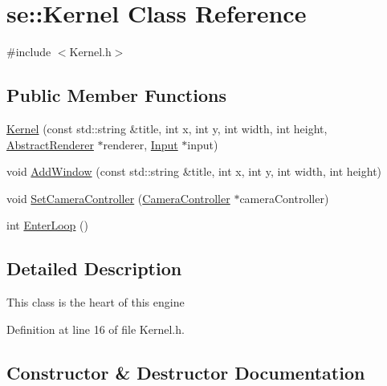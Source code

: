 \hypertarget{classse_1_1_kernel}{}\section{se\+:\+:Kernel Class Reference}
\label{classse_1_1_kernel}


{\ttfamily \#include $<$Kernel.\+h$>$}

\subsection*{Public Member Functions}
\begin{DoxyCompactItemize}
\item 
\mbox{\hyperlink{classse_1_1_kernel_aba58aee3a11c233553f819f4a92694af}{Kernel}} (const std\+::string \&title, int x, int y, int width, int height, \mbox{\hyperlink{classse_1_1_abstract_renderer}{Abstract\+Renderer}} $\ast$renderer, \mbox{\hyperlink{classse_1_1_input}{Input}} $\ast$input)
\item 
void \mbox{\hyperlink{classse_1_1_kernel_aa65f624076feaa97a95901077df35357}{Add\+Window}} (const std\+::string \&title, int x, int y, int width, int height)
\item 
void \mbox{\hyperlink{classse_1_1_kernel_a60a807b4f4e928752e7512f5b7b4a17c}{Set\+Camera\+Controller}} (\mbox{\hyperlink{classse_1_1_camera_controller}{Camera\+Controller}} $\ast$camera\+Controller)
\item 
int \mbox{\hyperlink{classse_1_1_kernel_a1faeac6fce02ccd7ff76d94ad78e0754}{Enter\+Loop}} ()
\end{DoxyCompactItemize}


\subsection{Detailed Description}
This class is the heart of this engine 

Definition at line 16 of file Kernel.\+h.



\subsection{Constructor \& Destructor Documentation}
\mbox{\label{classse_1_1_kernel_aba58aee3a11c233553f819f4a92694af}} 
